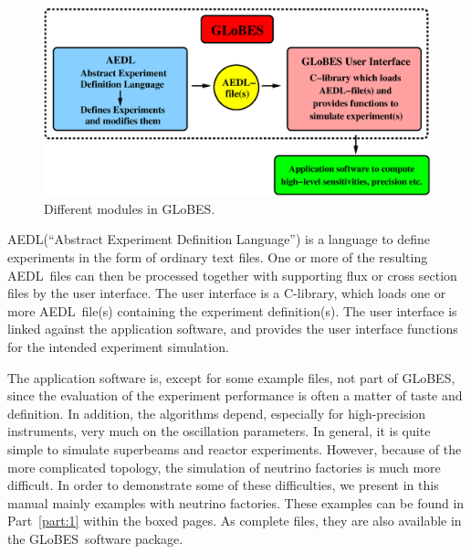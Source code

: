 \documentclass[a4paper,12pt,twoside]{book}
\newcommand{\Part}{Part}
\newcommand{\GLOBES}{{\sf GLoBES}}
\newcommand{\AEDL}{{\sf AEDL}}
\begin{document}
\begin{figure}[bht]
\begin{center}
\includegraphics[width=16cm]{GLOBES}
\end{center}
\caption{\label{fig:GLOBES} Different modules in \GLOBES .}
\end{figure}
%
\AEDL (``Abstract Experiment Definition Language'') is a language
to define experiments in the form of ordinary text files. One or more of 
the resulting \AEDL\ files can then be processed together with supporting 
flux or cross section files by the user interface. The user interface
is a C-library, which loads one or more \AEDL\ file(s)
containing the experiment definition(s). The user interface is linked 
against the application software, and provides the user interface functions
for the intended experiment simulation. 

The application 
software is, except for some example files, not part of \GLOBES , since
the evaluation of the experiment performance is often a matter of taste
and definition. In addition, the algorithms depend, especially for
high-precision instruments, very much on the oscillation parameters.
In general, it is quite simple to simulate superbeams and reactor
experiments. However, because of the more complicated topology, the
simulation of neutrino factories is much more difficult. In order
to demonstrate some of these difficulties, we present in this manual mainly
examples with neutrino factories. These examples can be found in
\Part~\ref{part:1} within the boxed pages. As complete files, they
are also available in the \GLOBES\ software package.
\end{document}
